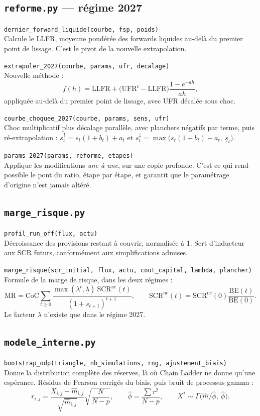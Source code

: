 \documentclass[10pt,a4paper]{article}
\newcommand{\fn}[2]{\par\smallskip\textcolor{bleufonce}{\texttt{#1}}\\ #2\par}
\begin{document}
\subsection{\texttt{reforme.py} — régime 2027}

\fn{dernier\_forward\_liquide(courbe, fsp, poids)}{Calcule le LLFR, moyenne pondérée des forwards
liquides au-delà du premier point de lissage. C'est le pivot de la nouvelle extrapolation.}

\fn{extrapoler\_2027(courbe, params, ufr, decalage)}{Nouvelle méthode :
\[
f(h) = \mathrm{LLFR} + \bigl(\mathrm{UFR}^c - \mathrm{LLFR}\bigr)\frac{1-e^{-ah}}{ah},
\]
appliquée au-delà du premier point de lissage, avec UFR décalée sous choc.}

\fn{courbe\_choquee\_2027(courbe, params, sens, ufr)}{Choc multiplicatif plus décalage parallèle,
avec planchers négatifs par terme, puis ré-extrapolation :
$s^{\uparrow}_t = s_t(1+b_t) + a_t$ et
$s^{\downarrow}_t = \max\bigl(s_t(1-b_t) - a_t,\ \underline s_t\bigr)$.}

\fn{params\_2027(params, reforme, etapes)}{Applique les modifications \emph{une à une}, sur une
copie profonde. C'est ce qui rend possible le pont du ratio, étape par étape, et garantit que le
paramétrage d'origine n'est jamais altéré.}

\subsection{\texttt{marge\_risque.py}}

\fn{profil\_run\_off(flux, actu)}{Décroissance des provisions restant à couvrir, normalisée à 1.
Sert d'inducteur aux SCR futurs, conformément aux simplifications admises.}

\fn{marge\_risque(scr\_initial, flux, actu, cout\_capital, lambda, plancher)}{Formule de la marge
de risque, dans les deux régimes :
\[
\mathrm{MR} = \mathrm{CoC}\sum_{t\ge0}\frac{\max(\lambda^t, \underline\lambda)\ \mathrm{SCR}^{\text{nc}}(t)}
{(1+s_{t+1})^{t+1}},
\qquad \mathrm{SCR}^{\text{nc}}(t) = \mathrm{SCR}^{\text{nc}}(0)\frac{\mathrm{BE}(t)}{\mathrm{BE}(0)}.
\]
Le facteur $\lambda$ n'existe que dans le régime 2027.}

\subsection{\texttt{modele\_interne.py}}

\fn{bootstrap\_odp(triangle, nb\_simulations, rng, ajustement\_biais)}{Donne la distribution
complète des réserves, là où Chain Ladder ne donne qu'une espérance. Résidus de Pearson corrigés
du biais, puis bruit de processus gamma :
\[
r_{i,j} = \frac{X_{i,j} - \hat m_{i,j}}{\sqrt{\hat m_{i,j}}}\sqrt{\frac{N}{N-p}},
\qquad
\hat\phi = \frac{\sum r^2}{N-p},
\qquad
X^{*} \sim \Gamma\bigl(\hat m/\hat\phi,\ \hat\phi\bigr).
\]}
\end{document}
